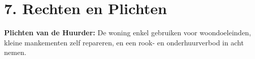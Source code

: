 \section*{7. Rechten en Plichten}
\textbf{Plichten van de Huurder:} De woning enkel gebruiken voor woondoeleinden, kleine mankementen zelf repareren, en een rook- en onderhuurverbod in acht nemen.
